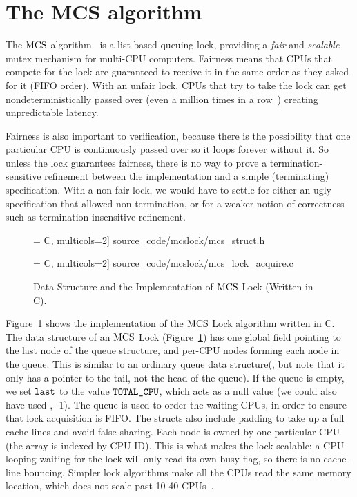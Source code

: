 \section{The MCS algorithm}
\label{chapter:mcslock:sec:overview}

The $\mathrm{MCS}$ algorithm~\cite{mcs91} is a list-based queuing lock,
providing a \emph{fair} and \emph{scalable} mutex mechanism for
multi-CPU computers. Fairness means that
CPUs that compete for the lock are guaranteed to receive it in the same
order as they asked for it (FIFO order). With an unfair lock, CPUs
that try to take the lock can get nondeterministically passed over
(even a million times in a row~\cite{lwn:ticketlocks}) creating
unpredictable latency.

Fairness is also important to verification, because
there is the possibility that one particular CPU is continuously
passed over so it loops forever without it.
So unless the lock
guarantees fairness, there is no way to prove a termination-sensitive
refinement between the implementation and a simple (terminating)
specification. With a non-fair lock, we would have to settle for
either an ugly specification that allowed non-termination, or for a
weaker notion of correctness such as termination-insensitive
refinement.
\begin{figure}
 = C, multicols=2] {source_code/mcslock/mcs_struct.h}
\vspace{1em}

 = C, multicols=2] {source_code/mcslock/mcs_lock_acquire.c}
\caption{Data Structure and the Implementation of $\mathrm{MCS}$ Lock (Written in C).}
\label{fig:chapter:mcslock:mcs_lock}
\end{figure}

Figure~\ref{fig:chapter:mcslock:mcs_lock} shows the implementation of the $\mathrm{MCS}$ Lock algorithm written in C. 
The data structure of an $\mathrm{MCS}$ Lock (Figure~\ref{fig:chapter:mcslock:mcs_lock}) has
one global field pointing to the last node of the queue structure, and
per-CPU nodes forming each node in the queue. This is similar to an
ordinary queue data structure(, but note that it only has a
pointer to the tail, not the head of the queue).  If the queue is
empty, we set ${\mathrm{\texttt{last}}}$ to the value ${\mathrm{\texttt{TOTAL\_CPU}}}$, which
acts as a null value (we could also have used \eg, -1). The queue is
used to order the waiting CPUs, in order to ensure that lock
acquisition is FIFO. The structs also include padding to take up a
full cache lines and avoid false sharing.  Each node is owned by one
particular CPU (the array is indexed by CPU ID).  This is what makes
the lock scalable: a CPU looping waiting for the lock will only read
its own busy flag, so there is no cache-line bouncing. Simpler lock
algorithms make all the CPUs read the same memory location, which does
not scale past 10-40 CPUs~\cite{Boyd-wickizer12}.

